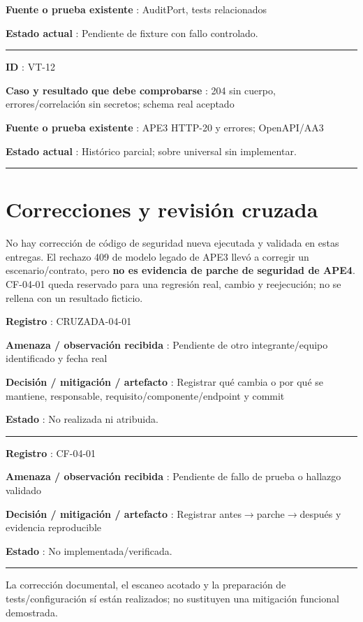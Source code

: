 \documentclass[12pt,a4paper]{report}
\begin{document}
\textbf{Fuente o prueba existente }: AuditPort, tests relacionados

\textbf{Estado actual }: Pendiente de fixture con fallo controlado.

\medskip\hrule\medskip

\textbf{ID }: VT-12

\textbf{Caso y resultado que debe comprobarse }: 204 sin cuerpo,
errores/correlación sin secretos; schema real aceptado

\textbf{Fuente o prueba existente }: APE3 HTTP-20 y errores; OpenAPI/AA3

\textbf{Estado actual }: Histórico parcial; sobre universal sin
implementar.

\medskip\hrule\medskip

\section{Correcciones y revisión
cruzada}\label{AA4-semana-4-anexo1-correcciones-y-revisiuxf3n-cruzada}

No hay corrección de código de seguridad nueva ejecutada y validada en
estas entregas. El rechazo 409 de modelo legado de APE3 llevó a corregir
un escenario/contrato, pero \textbf{no es evidencia de parche de
seguridad de APE4}. CF-04-01 queda reservado para una regresión real,
cambio y reejecución; no se rellena con un resultado ficticio.

\textbf{Registro }: CRUZADA-04-01

\textbf{Amenaza / observación recibida }: Pendiente de otro
integrante/equipo identificado y fecha real

\textbf{Decisión / mitigación / artefacto }: Registrar qué cambia o por
qué se mantiene, responsable, requisito/componente/endpoint y commit

\textbf{Estado }: No realizada ni atribuida.

\medskip\hrule\medskip

\textbf{Registro }: CF-04-01

\textbf{Amenaza / observación recibida }: Pendiente de fallo de prueba o
hallazgo validado

\textbf{Decisión / mitigación / artefacto }: Registrar
antes\ensuremath{\rightarrow}parche\ensuremath{\rightarrow}después y evidencia reproducible

\textbf{Estado }: No implementada/verificada.

\medskip\hrule\medskip

La corrección documental, el escaneo acotado y la preparación de
tests/configuración sí están realizados; no sustituyen una mitigación
funcional demostrada.
\end{document}
